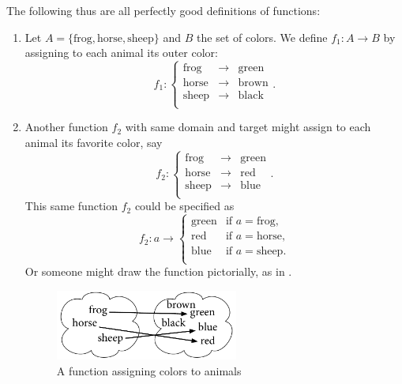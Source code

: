 The following thus are all perfectly good definitions of functions:
\begin{enumerate}
\item  Let $A=\{\mbox{frog},\mbox{horse},\mbox{sheep}\}$ and $B$ the set of
colors. We define $f_1\colon A\to B$ by assigning to each animal its outer
color:
\[
f_1\colon \left\{\begin{array}{lcl}
\mbox{frog}&\to&\mbox{green}\\
\mbox{horse}&\to&\mbox{brown}\\
\mbox{sheep}&\to&\mbox{black}\\
\end{array}
\right..
\]

\item Another function $f_2$ with same domain and target might assign to each animal its favorite color, say
\[
f_2\colon \left\{\begin{array}{lcl}
\mbox{frog}&\to&\mbox{green}\\
\mbox{horse}&\to&\mbox{red}\\
\mbox{sheep}&\to&\mbox{blue}\\
\end{array}
\right..
\]
This same function $f_2$ could be specified as
\[
f_2\colon a\to\left\{\begin{array}{ll}
\mbox{green}&\mbox{if $a=$frog,}\\
\mbox{red}&\mbox{if $a=$horse,}\\
\mbox{blue}&\mbox{if $a=$sheep.}\\
\end{array}
\right.
\]
Or someone might draw the function pictorially, as in
.
\begin{figure}[t]
\begin{center}
\includegraphics[width=6cm]{pic/AnimalColor.pdf}
\end{center}
\caption{A function assigning colors to animals}
\label{figfroghorsesheep}
\end{figure}


\end{enumerate}
